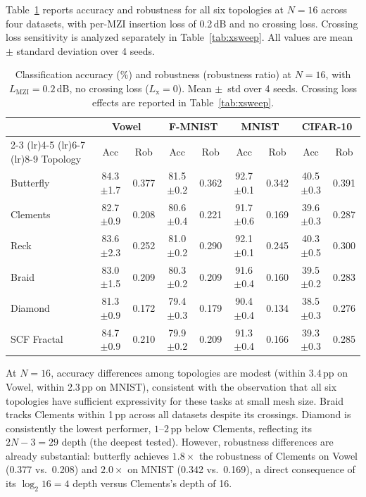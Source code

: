 \documentclass[11pt,a4paper]{article}
\begin{document}
Table~\ref{tab:n16} reports accuracy and robustness for all six topologies at
$N{=}16$ across four datasets, with per-MZI insertion loss of 0.2\,dB and no
crossing loss.  Crossing loss sensitivity is analyzed separately in
Table~\ref{tab:xsweep}.  All values are mean $\pm$ standard deviation
over 4 seeds.

\begin{table}[H]
\centering
\caption{Classification accuracy (\%) and robustness (robustness ratio) at $N{=}16$, with
$L_{\mathrm{MZI}} = 0.2$\,dB, no crossing loss ($L_{\mathrm{x}} = 0$).  Mean $\pm$~std
over 4 seeds.  Crossing loss effects are reported in Table~\ref{tab:xsweep}.}
\label{tab:n16}
\begin{tabular}{lcccccccc}
\toprule
 & \multicolumn{2}{c}{Vowel} & \multicolumn{2}{c}{F-MNIST} & \multicolumn{2}{c}{MNIST} & \multicolumn{2}{c}{CIFAR-10} \\
\cmidrule(lr){2-3} \cmidrule(lr){4-5} \cmidrule(lr){6-7} \cmidrule(lr){8-9}
Topology & Acc & Rob & Acc & Rob & Acc & Rob & Acc & Rob \\
\midrule
Butterfly    & 84.3$\pm$1.7 & 0.377 & 81.5$\pm$0.2 & 0.362 & 92.7$\pm$0.1 & 0.342 & 40.5$\pm$0.3 & 0.391 \\
Clements     & 82.7$\pm$0.9 & 0.208 & 80.6$\pm$0.4 & 0.221 & 91.7$\pm$0.6 & 0.169 & 39.6$\pm$0.3 & 0.287 \\
Reck         & 83.6$\pm$2.3 & 0.252 & 81.0$\pm$0.2 & 0.290 & 92.1$\pm$0.1 & 0.245 & 40.3$\pm$0.5 & 0.300 \\
Braid        & 83.0$\pm$1.5 & 0.209 & 80.3$\pm$0.2 & 0.209 & 91.6$\pm$0.4 & 0.160 & 39.5$\pm$0.2 & 0.283 \\
Diamond      & 81.3$\pm$0.9 & 0.172 & 79.4$\pm$0.3 & 0.179 & 90.4$\pm$0.4 & 0.134 & 38.5$\pm$0.3 & 0.276 \\
SCF Fractal  & 84.7$\pm$0.9 & 0.210 & 79.9$\pm$0.2 & 0.209 & 91.3$\pm$0.4 & 0.166 & 39.3$\pm$0.3 & 0.285 \\
\bottomrule
\end{tabular}
\end{table}

At $N{=}16$, accuracy differences among topologies are modest (within 3.4\,pp on
Vowel, within 2.3\,pp on MNIST), consistent with the observation that all six
topologies have sufficient expressivity for these tasks at small mesh size.
Braid tracks Clements within 1\,pp across all datasets despite its crossings.
Diamond is consistently the lowest performer, $1$--$2$\,pp below Clements,
reflecting its $2N{-}3 = 29$ depth (the deepest tested).
However, robustness differences are already substantial: butterfly achieves
$1.8\times$ the robustness of Clements on Vowel (0.377 vs.\ 0.208) and
$2.0\times$ on MNIST (0.342 vs.\ 0.169), a direct consequence of its
$\log_2 16 = 4$ depth versus Clements's depth of 16.
\end{document}
